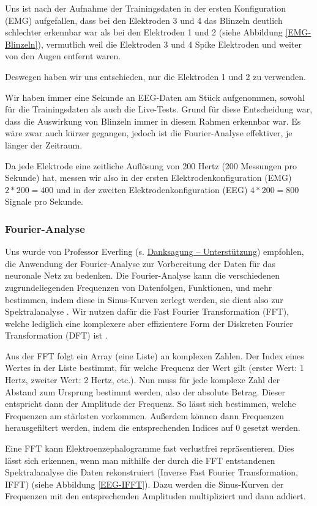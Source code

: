\documentclass[11pt]{scrartcl}
\begin{document}
	Uns ist nach der Aufnahme der Trainingsdaten in der ersten Konfiguration (EMG) aufgefallen, dass bei den Elektroden 3 und 4 das Blinzeln deutlich schlechter erkennbar war als bei den Elektroden 1 und 2 (siehe Abbildung \ref{EMG-Blinzeln}), vermutlich weil die Elektroden 3 und 4 Spike Elektroden und weiter von den Augen entfernt waren.

	Deswegen haben wir uns entschieden, nur die Elektroden 1 und 2 zu verwenden.

	Wir haben immer eine Sekunde an EEG-Daten am Stück aufgenommen, sowohl für die Trainingsdaten als auch die Live-Tests. Grund für diese Entscheidung war, dass die Auswirkung von Blinzeln immer in diesem Rahmen erkennbar war. Es wäre zwar auch kürzer gegangen, jedoch ist die Fourier-Analyse effektiver, je länger der Zeitraum.

	Da jede Elektrode eine zeitliche Auflösung von 200 Hertz (200 Messungen pro Sekunde) hat, messen wir also in der ersten Elektrodenkonfiguration (EMG) $2 * 200 = 400$ und in der zweiten Elektrodenkonfiguration (EEG) $4 * 200 = 800$ Signale pro Sekunde.

	\subsubsection{Fourier-Analyse}
	
	Uns wurde von Professor Everling (s. \hyperref[Unterstuetzung]{Danksagung -- Unterstützung}) empfohlen, die Anwendung der Fourier-Analyse zur Vorbereitung der Daten für das neuronale Netz zu bedenken. Die Fourier-Analyse kann die verschiedenen zugrundeliegenden Frequenzen von Datenfolgen, Funktionen, und mehr bestimmen, indem diese in Sinus-Kurven zerlegt werden, sie dient also zur Spektralanalyse \cite{3b1b:fft}. Wir nutzen dafür die Fast Fourier Transformation (FFT), welche lediglich eine komplexere aber effizientere Form der Diskreten Fourier Transformation (DFT) ist \cite{FFT-DFT}.

	Aus der FFT folgt ein Array (eine Liste) an komplexen Zahlen. Der Index eines Wertes in der Liste bestimmt, für welche Frequenz der Wert gilt (erster Wert: 1 Hertz, zweiter Wert: 2 Hertz, etc.). Nun muss für jede komplexe Zahl der Abstand zum Ursprung bestimmt werden, also der absolute Betrag. Dieser entspricht dann der Amplitude der Frequenz. So lässt sich bestimmen, welche Frequenzen am stärksten vorkommen. Außerdem können dann Frequenzen herausgefiltert werden, indem die entsprechenden Indices auf 0 gesetzt werden. 

	Eine FFT kann Elektroenzephalogramme fast verlustfrei repräsentieren. Dies lässt sich erkennen, wenn man mithilfe der durch die FFT entstandenen Spektralanalyse die Daten rekonstruiert (Inverse Fast Fourier Transformation, IFFT) (siehe Abbildung \ref{EEG-IFFT}). Dazu werden die Sinus-Kurven der Frequenzen mit den entsprechenden Amplituden multipliziert und dann addiert.
\end{document}
